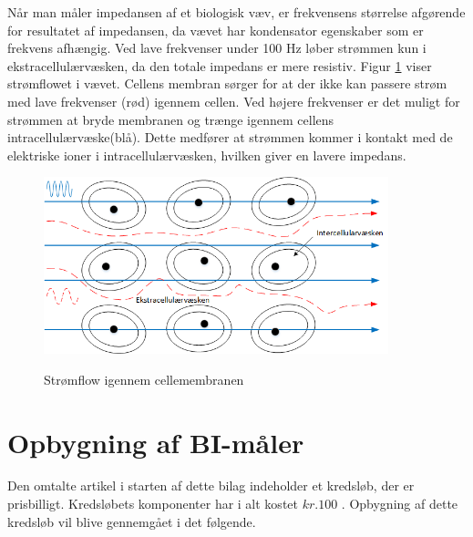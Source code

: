 Når man måler impedansen af et biologisk væv, er frekvensens størrelse afgørende for resultatet af impedansen, da vævet har kondensator egenskaber som er frekvens afhængig. Ved lave frekvenser under 100 Hz løber strømmen kun i ekstracellulærvæsken, da den totale impedans er mere resistiv. Figur \ref{fig:celler} viser strømflowet i vævet.  Cellens membran sørger for at der ikke kan passere strøm med lave frekvenser (rød) igennem cellen. Ved højere frekvenser er det muligt for strømmen at bryde membranen og trænge igennem cellens intracellulærvæske(blå). Dette medfører at strømmen kommer i kontakt med de elektriske ioner i intracellulærvæsken, hvilken giver en lavere impedans. 



\begin{figure}[H]
\centering
{\includegraphics[width=10cm]
{Figure/celler}}
\caption{Strømflow igennem cellemembranen}
\label{fig:celler}
\end{figure}










\section{Opbygning af BI-måler}

Den omtalte artikel i starten af dette bilag indeholder et kredsløb, der er prisbilligt. Kredsløbets komponenter har i alt kostet $ kr. 100$ \cite{Nr}. Opbygning af dette kredsløb vil blive gennemgået i det følgende. 



